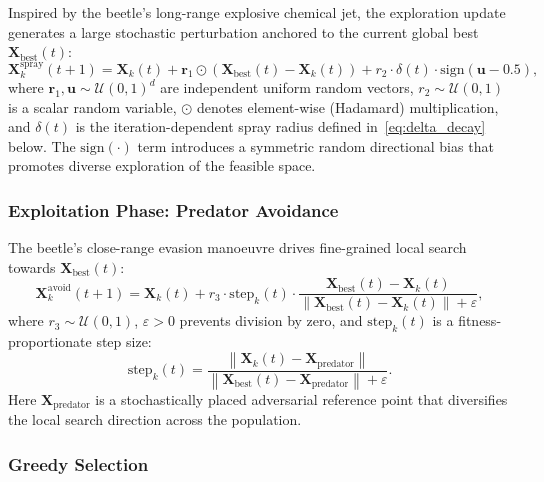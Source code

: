 \documentclass[journal,twoside,letterpaper]{IEEEtran}
\newcommand{\vect}[1]{\mathbf{#1}}
\newcommand{\norm}[1]{\left\|#1\right\|}
\begin{document}
Inspired by the beetle's long-range explosive chemical jet, the exploration
update generates a large stochastic perturbation anchored to the current
global best $\vect{X}_{\mathrm{best}}(t)$:
\begin{equation}
  \vect{X}^{\mathrm{spray}}_k(t+1) =
    \vect{X}_k(t)
    + \vect{r}_1 \odot \!\left(\vect{X}_{\mathrm{best}}(t) - \vect{X}_k(t)\right)
    + r_2 \cdot \delta(t) \cdot \mathrm{sign}\!\left(\vect{u} - 0.5\right),
  \label{eq:bbo_spray}
\end{equation}
where $\vect{r}_1, \vect{u} \sim \mathcal{U}(0,1)^d$ are independent
uniform random vectors, $r_2 \sim \mathcal{U}(0,1)$ is a scalar random
variable, $\odot$ denotes element-wise (Hadamard) multiplication, and
$\delta(t)$ is the iteration-dependent spray radius defined
in~\eqref{eq:delta_decay} below.  The $\mathrm{sign}(\cdot)$ term
introduces a symmetric random directional bias that promotes diverse
exploration of the feasible space.

\subsubsection{Exploitation Phase: Predator Avoidance}

The beetle's close-range evasion manoeuvre drives fine-grained local search
towards $\vect{X}_{\mathrm{best}}(t)$:
\begin{equation}
  \vect{X}^{\mathrm{avoid}}_k(t+1) =
    \vect{X}_k(t)
    + r_3 \cdot \mathrm{step}_k(t) \cdot
      \frac{\vect{X}_{\mathrm{best}}(t) - \vect{X}_k(t)}
           {\norm{\vect{X}_{\mathrm{best}}(t) - \vect{X}_k(t)} + \varepsilon},
  \label{eq:bbo_avoid}
\end{equation}
where $r_3 \sim \mathcal{U}(0,1)$, $\varepsilon > 0$ prevents division by
zero, and $\mathrm{step}_k(t)$ is a fitness-proportionate step size:
\begin{equation}
  \mathrm{step}_k(t) =
    \frac{\norm{\vect{X}_k(t) - \vect{X}_{\mathrm{predator}}}}
         {\norm{\vect{X}_{\mathrm{best}}(t) - \vect{X}_{\mathrm{predator}}} + \varepsilon}.
  \label{eq:bbo_step}
\end{equation}
Here $\vect{X}_{\mathrm{predator}}$ is a stochastically placed adversarial
reference point that diversifies the local search direction across the
population.

\subsubsection{Greedy Selection}
\end{document}
